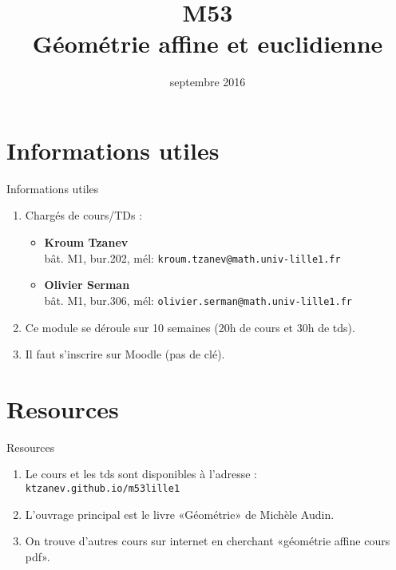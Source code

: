 \documentclass[
simple,
handout,
bigger]{m53beamer}
\title{M53\\Géométrie affine et euclidienne}
\date{septembre 2016}
\begin{document}
\begin{frame}
  \titlepage
\end{frame}

\section{Informations utiles}
\begin{frame}{Informations utiles}
  \begin{enumerate}[<+(1)->]
    \item Chargés de cours/TDs :
          \begin{itemize}
            \item \textbf{Kroum Tzanev}\\
              bât. M1, bur.202, mél: \texttt{kroum.tzanev@math.univ-lille1.fr}
            \item \textbf{Olivier Serman}\\
              bât. M1, bur.306, mél: \texttt{olivier.serman@math.univ-lille1.fr}
          \end{itemize}
    \item Ce module se déroule sur 10 semaines (20h de cours et 30h de tds).
    \item Il faut s'inscrire sur Moodle (pas de clé).
  \end{enumerate}
\end{frame}

\section{Resources}
\begin{frame}{Resources}
  \begin{enumerate}[<+(1)->]
    \item Le cours et les tds sont disponibles à l'adresse :
      \texttt{ktzanev.github.io/m53lille1}
    \item L'ouvrage principal est le livre «Géométrie» de Michèle Audin.
    \item On trouve d'autres cours sur internet en cherchant «géométrie affine cours pdf».
  \end{enumerate}
\end{frame}

\end{document}
